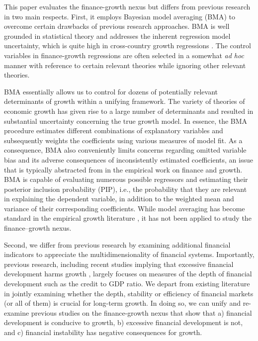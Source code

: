 This paper evaluates the finance-growth nexus but differs from previous research in two main respects. First, it employs Bayesian model averaging (BMA) to overcome certain drawbacks of previous research approaches. BMA is well grounded in statistical theory \citep{Rafteryetal1997} and addresses the inherent regression model uncertainty, which is quite high in cross-country growth regressions \citep{Fernandezetal2001, SalaiMartinetal2004, Durlaufetal2008}. The control variables in finance-growth regressions are often selected in a somewhat \textit{ad hoc} manner with reference to certain relevant theories while ignoring other relevant theories. 

BMA essentially allows us to control for dozens of potentially relevant determinants of growth within a unifying framework. The variety of theories of economic growth has given rise to a large number of determinants and resulted in substantial uncertainty concerning the true growth model. In essence, the BMA procedure estimates different combinations of explanatory variables and subsequently weights the coefficients using various measures of model fit. As a consequence, BMA also conveniently limits concerns regarding omitted variable bias and its adverse consequences of inconsistently estimated coefficients, an issue that is typically abstracted from in the empirical work on finance and growth. BMA is capable of evaluating numerous possible regressors and estimating their posterior inclusion probability (PIP), i.e., the probability that they are relevant in explaining the dependent variable, in addition to the weighted mean and variance of their corresponding coefficients. While model averaging has become standard in the empirical growth literature \citep{SalaiMartinetal2004, Durlaufetal2008}, it has not been applied to study the finance--growth nexus.  

Second, we differ from previous research by examining additional financial indicators to appreciate the multidimensionality of financial systems. Importantly, previous research, including recent studies implying that excessive financial development harms growth \citep{Arcandetal2012,CecchettiKharroubi2012,LawSingh2014}, largely focuses on measures of the depth of financial development such as the credit to GDP ratio. We depart from existing literature in jointly examining whether the depth, stability or efficiency of financial markets (or all of them) is crucial for long-term growth. In doing so, we can unify and re-examine previous studies on the finance-growth nexus that show that a) financial development is conducive to growth, b) excessive financial development is not, and c) financial instability has negative consequences for growth.

